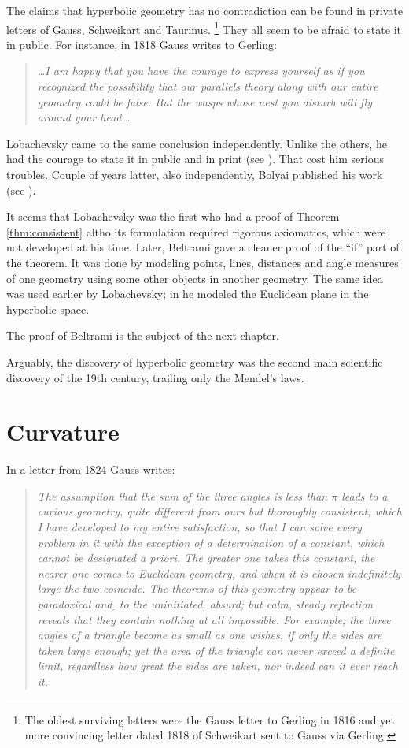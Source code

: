 The claims
that hyperbolic geometry has no contradiction can be found in private letters of
Gauss, 
Schweikart 
and Taurinus.%
\footnote{The oldest surviving letters were the Gauss letter to Gerling in 1816 
and yet more convincing letter dated 1818 
of Schweikart sent to Gauss via Gerling.}
They all seem to be afraid to state it in public.
For instance, in 1818 Gauss writes to Gerling:

\begin{quotation}{\it
\dots I am happy that you have the courage to express yourself as if you recognized the possibility
that our parallels theory along with our entire geometry could be false. But the wasps whose
nest you disturb will fly around your head.\dots}
\end{quotation}

Lobachevsky came to the same conclusion independently.
Unlike the others, he had the courage to state it in public and in print (see \cite{lobachevsky}).
That cost him serious troubles.
Couple of years latter, also independently, Bolyai published his work (see \cite{bolyai}).

It seems that Lobachevsky was the first who had a proof of Theorem \ref{thm:consistent} altho its formulation required rigorous axiomatics, which were not developed at his time.
Later, Beltrami gave a cleaner proof of the ``if'' part of the theorem.
It was done by modeling points, lines, distances and angle measures of one geometry using some other objects in another geometry.
The same idea was used earlier by Lobachevsky; 
in \cite[34]{lobachevsky-1840} he modeled the Euclidean plane in the hyperbolic space.

The proof of Beltrami is the subject of the next chapter. 

\medskip

Arguably, the discovery of hyperbolic geometry was the second main scientific discovery of the 19th century, 
trailing only the Mendel's laws.

\section*{Curvature}
In a letter from 1824 Gauss writes: 

\begin{quotation}{\it
The assumption that the sum of the three angles is less than $\pi$ leads to a curious geometry, 
quite different from ours but thoroughly consistent, 
which I have developed to my entire satisfaction, 
so that I can solve every problem in it with the exception of a determination of a constant, which cannot be designated a priori. 
The greater one takes this constant, the nearer one comes to Euclidean geometry, 
and when it is chosen indefinitely large the two coincide.
The theorems of this geometry appear to be paradoxical and, 
to the uninitiated, absurd; but calm, steady reflection reveals that they contain nothing at all impossible. 
For example, the three angles of a triangle become as small as one wishes, if only the sides are taken large enough; 
yet the area of the triangle can never exceed a definite limit, regardless how great the sides are taken, 
nor indeed can it ever reach it.}
\end{quotation} 

